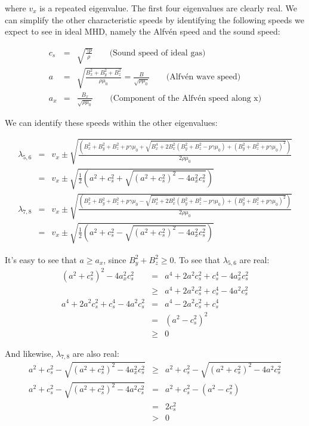 \documentclass[%
 reprint,
 amsmath,amssymb,
 aps,
]{revtex4-2}
\begin{document}
where $v_x$ is a repeated eigenvalue. The first four eigenvalues are clearly real. We can simplify the other characteristic speeds by identifying the following speeds we expect to see in ideal MHD, namely the Alfvén speed and the sound speed:

\begin{eqnarray}
c_s & = & \sqrt{\frac{\gamma p}{\rho}} \qquad \text{(Sound speed of ideal gas)}\\
a & = & \sqrt{\frac{B_x ^2 + B_y ^2 + B_z ^2}{\rho \mu_0}} =  \frac{B}{\sqrt{\rho \mu_0}} \qquad \text{(Alfvén wave speed)} \\
a_x & = & \frac{B_x}{\sqrt{\rho \mu_0}} \qquad \text{(Component of the Alfvén speed along x)}
\end{eqnarray}

We can identify these speeds within the other eigenvalues:

\begin{eqnarray}
\lambda_{5, 6} & = & v_x \pm \sqrt{\frac{\left(B_x ^2 + B_y ^2 + B_z ^2 + p \gamma \mu_0 + \sqrt{B_x ^4 + 2 B_x ^2 (B_y ^2 + B_z ^2 - p \gamma \mu_0) + (B_y ^2 + B_z ^2 + p \gamma \mu_0)^2} \right)}{2 \rho \mu_0}} \\
& = & v_x \pm \sqrt{\frac{1}{2}\left(a^2 + c_s ^2 + \sqrt{(a^2 + c_s ^2)^2 - 4 a_x ^2 c_s ^2}\right)} \\
\lambda_{7, 8} & = & v_x \pm \sqrt{\frac{\left(B_x ^2 + B_y ^2 + B_z ^2 + p \gamma \mu_0 - \sqrt{B_x ^4 + 2 B_x ^2 (B_y ^2 + B_z ^2 - p \gamma \mu_0) + (B_y ^2 + B_z ^2 + p \gamma \mu_0)^2} \right)}{2 \rho \mu_0}} \\
& = & v_x \pm \sqrt{\frac{1}{2}\left(a^2 + c_s ^2 - \sqrt{(a^2 + c_s ^2)^2 - 4 a_x ^2 c_s ^2}\right)}
\end{eqnarray}

It's easy to see that $a \geq a_x$, since $B_y ^2 + B_z ^2 \geq 0$. To see that $\lambda_{5, 6}$ are real:
\begin{eqnarray}
(a^2 + c_s ^2) ^2 - 4 a_x ^2 c_s ^2 & = & a^4 + 2a^2 c_s^2 + c_s ^4 - 4 a_x ^2 c_s ^2 \\
& \geq & a^4 + 2 a^2 c_s^2 + c_s ^4 - 4 a ^2 c_s ^2 \\
a^4 + 2 a^2 c_s^2 + c_s ^4 - 4 a ^2 c_s ^2 & = & a^4 - 2 a^2 c_s ^2 + c_s ^4 \\
& = & (a^2 - c_s^2)^2 \\
& \geq & 0
\end{eqnarray}

And likewise, $\lambda_{7, 8}$ are also real:
\begin{eqnarray}
a^2 + c_s ^2 - \sqrt{(a^2 + c_s ^2)^2 - 4 a_x ^2 c_s ^2} & \geq & a^2 + c_s ^2 - \sqrt{(a^2 + c_s ^2)^2 - 4 a ^2 c_s ^2} \\
a^2 + c_s ^2 - \sqrt{(a^2 + c_s ^2)^2 - 4 a ^2 c_s ^2} & = & a^2 + c_s ^2 - (a^2 - c_s ^2) \\
& = & 2 c_s ^2 \\
& > & 0
\end{eqnarray}
\end{document}

